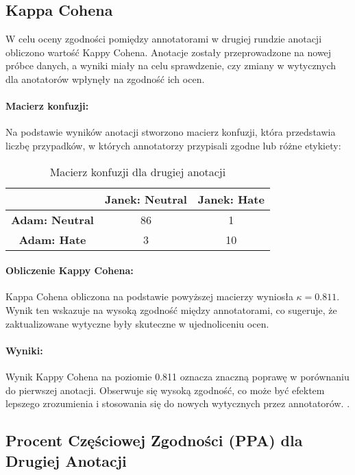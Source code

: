 \documentclass[12pt]{article}
\begin{document}
\subsection{Kappa Cohena}

W celu oceny zgodności pomiędzy annotatorami w drugiej rundzie anotacji obliczono wartość Kappy Cohena. Anotacje zostały przeprowadzone na nowej próbce danych, a wyniki miały na celu sprawdzenie, czy zmiany w wytycznych dla anotatorów wpłynęły na zgodność ich ocen.

\paragraph{Macierz konfuzji:}
Na podstawie wyników anotacji stworzono macierz konfuzji, która przedstawia liczbę przypadków, w których annotatorzy przypisali zgodne lub różne etykiety:

\begin{table}[h!]
\centering
\begin{tabular}{|c|c|c|}
\hline
           & \textbf{Janek: Neutral} & \textbf{Janek: Hate} \\ \hline
\textbf{Adam: Neutral} & 86                      & 1                   \\ \hline
\textbf{Adam: Hate}    & 3                       & 10                  \\ \hline
\end{tabular}
\caption{Macierz konfuzji dla drugiej anotacji}
\end{table}

\paragraph{Obliczenie Kappy Cohena:}
Kappa Cohena obliczona na podstawie powyższej macierzy wyniosła \( \kappa = 0.811 \). Wynik ten wskazuje na wysoką zgodność między annotatorami, co sugeruje, że zaktualizowane wytyczne były skuteczne w ujednoliceniu ocen.

\paragraph{Wyniki:}
Wynik Kappy Cohena na poziomie 0.811 oznacza znaczną poprawę w porównaniu do pierwszej anotacji. Obserwuje się wysoką zgodność, co może być efektem lepszego zrozumienia i stosowania się do nowych wytycznych przez annotatorów. .

\subsection{Procent Częściowej Zgodności (PPA) dla Drugiej Anotacji}
\end{document}
